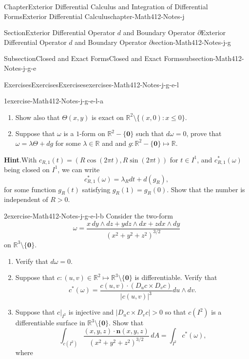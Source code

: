\documentclass[oneside,10pt,]{book}
\newcommand{\blocktitlefont}{\relax}
\numberwithin{equation}{section}
\newcommand{\bn}{\mathbf{n}}
\newcommand{\bbR}{\mathbb{R}}
\begin{document}
\begin{chapterptx}{Chapter}{Exterior Differential Calculus and Integration of Differential Forms}{}{Exterior Differential Calculus}{}{}{chapter-Math412-Notes-j}
\begin{sectionptx}{Section}{Exterior Differential Operator \(d\) and Boundary Operator \(\partial\)}{}{Exterior Differential Operator \(d\) and Boundary Operator \(\partial\)}{}{}{section-Math412-Notes-j-g}
\begin{subsectionptx}{Subsection}{Closed and Exact Forms}{}{Closed and Exact Forms}{}{}{subsection-Math412-Notes-j-g-e}
\begin{exercises-subsubsection-numberless}{Exercises}{Exercises}{}{Exercises}{}{}{exercises-Math412-Notes-j-g-e-l}
\begin{divisionexercise}{1}{}{}{exercise-Math412-Notes-j-g-e-l-a}
\begin{enumerate}[label=(\alph*)]
\item{}Show also that \(\Theta (x, y)\) is exact on \(\bbR^{2}\setminus\{(x, 0): x\le 0\}\).%
\item{}Suppose that \(\omega\) is a \(1\)-form on \(\bbR^{2}-\{\mathbf 0\}\) such that \(d\omega=0\), prove that \(\omega = \lambda \Theta + dg\) for some \(\lambda \in \bbR\) and and \(g:\bbR^{2}-\{\mathbf 0\}\mapsto \bbR\).%
\end{enumerate}
%
\par\smallskip%
\noindent\textbf{\blocktitlefont Hint}.\hypertarget{hint-Math412-Notes-j-g-e-l-a-b}{}\quad{}With \(c_{R,1}(t)=(R\cos (2\pi t), R\sin (2\pi t))\) for \(t\in I^{1}\), and \(c_{R,1}^{*}(\omega)\) being closed on \(I^{1}\), we can write%
\begin{equation*}
c_{R,1}^{*}(\omega) = \lambda_{R} dt + d(g_{R}),
\end{equation*}
for some function \(g_{R}(t)\) satisfying \(g_{R}(1)=g_{R}(0)\). Show that the number is independent of  \(R>0\).\end{divisionexercise}%
\begin{divisionexercise}{2}{}{}{exercise-Math412-Notes-j-g-e-l-b}%
Consider the two-form%
\begin{equation*}
\omega=\frac{x\, dy\wedge dz + y dz\wedge dx + z dx \wedge dy}{(x^{2}+y^{2}
+z^{2})^{3/2}}
\end{equation*}
on \(\bbR^{3}\setminus\{\mathbf 0\}\).%
\begin{enumerate}[label=(\alph*)]
\item{}Verify that \(d\omega =0\).%
\item{}Suppose that \(c: (u, v)\in \bbR^{2}\mapsto \bbR^{3}\setminus\{\mathbf 0\}\) is differentiable. Verify that%
\begin{equation*}
c^{*}(\omega)=\frac{c(u, v) \cdot \left(D_{u} c\times D_{v} c\right) }{|c(u, v)|^{3}}  du\wedge dv.
\end{equation*}
%
\item{}Suppose that \(c\Big|_{I^{2}}\) is injective and \(|D_{u} c\times D_{v} c|>0\) so that \(c(I^{2})\) is a differentiable surface in \(\bbR^{3}\setminus\{\mathbf 0\}\). Show that%
\begin{equation*}
\int_{c(I^{2})} \frac{(x, y, z)\cdot \bn(x, y, z)}{(x^{2}+y^{2}
+z^{2})^{3/2}}\, dA= \int_{I^{2}} c^{*}(\omega)\text{,}
\end{equation*}
where%
\begin{equation*}

\end{equation*}
\end{enumerate}
\end{divisionexercise}
\end{exercises-subsubsection-numberless}
\end{subsectionptx}
\end{sectionptx}
\end{chapterptx}
\end{document}
